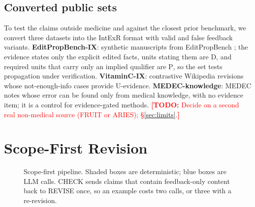 \documentclass[11pt]{article}
\newcommand{\todo}[1]{\textcolor{red}{\textbf{[TODO:} #1\textbf{]}}}
\newcommand{\D}{\textsc{D}}
\newcommand{\Pp}{\textsc{P}}
\newcommand{\K}{\textsc{K}}
\newcommand{\U}{\textsc{U}}
\begin{document}
\subsection{Converted public sets}
To test the claims outside medicine and against the closest prior benchmark, we convert three datasets into the IntExR format with valid and false feedback variants. \textbf{EditPropBench-IX}: synthetic manuscripts from EditPropBench \citep{kruthof2026editpropbench}; the evidence states only the explicit edited facts, units stating them are \D{}, and required units that carry only an implied qualifier are \Pp{}, so the set tests propagation under verification. \textbf{VitaminC-IX}: contrastive Wikipedia revisions \citep{schuster2021vitaminc} whose not-enough-info cases provide \U-evidence. \textbf{MEDEC-knowledge}: MEDEC notes whose error can be found only from medical knowledge, with no evidence item; it is a control for evidence-gated methods. \todo{Decide on a second real non-medical source (FRUIT or ARIES); \S\ref{sec:limits}.}

\section{Scope-First Revision}
\label{sec:method}
\begin{figure}[t]
\centering
{}
\caption{Scope-first pipeline. Shaded boxes are deterministic; blue boxes are LLM calls. CHECK sends claims that contain feedback-only content back to REVISE once, so an example costs two calls, or three with a re-revision.}
\label{fig:pipeline}
\end{figure}
\end{document}
